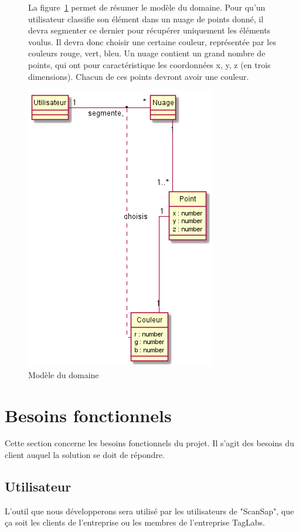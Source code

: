 \documentclass[12pt,titlepage,french]{article}
\begin{document}
\begin{figure} [!hbtp]
\begin{minipage}[c]{0.60\linewidth}
La figure~\ref{Modèle du domaine} permet de résumer le modèle du domaine. Pour qu'un utilisateur classifie son élément dans un nuage de points donné, il devra segmenter ce dernier pour récupérer uniquement les éléments voulus. Il devra donc choisir une certaine couleur, représentée par les couleurs rouge, vert, bleu. Un nuage contient un grand nombre de points, qui ont pour caractéristique les coordonnées x, y, z (en trois dimensions). Chacun de ces points devront avoir une couleur.
\end{minipage} \hfill
\begin{minipage}[c]{0.40\linewidth}
    \centering
    \caption{Modèle du domaine}
    \label{Modèle du domaine}
    \includegraphics[scale=0.60]{modele_domaine.png}
    \end{minipage}
\end{figure}

\break
\section{Besoins fonctionnels}

Cette section concerne les besoins fonctionnels du projet.
Il s'agit des besoins du client auquel la solution se doit de répondre.

\subsection*{Utilisateur}
L'outil que nous développerons sera utilisé par les utilisateurs de "ScanSap", que ça soit les clients de l'entreprise ou les membres de l'entreprise TagLabs.
\end{document}
